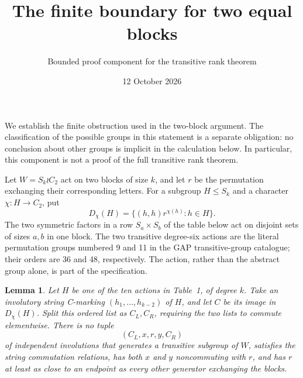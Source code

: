 \documentclass[11pt]{article}
\title{The finite boundary for two equal blocks}
\author{Bounded proof component for the transitive rank theorem}
\date{12 October 2026}
\newtheorem{lemma}{Lemma}
\begin{document}
\maketitle

We establish the finite obstruction used in the two-block argument.
The classification of the possible groups in this statement is a
separate obligation: no conclusion about other groups is implicit in
the calculation below. In particular, this component is not a proof
of the full transitive rank theorem.

Let $W=S_k\wr C_2$ act on two blocks of size $k$, and let $r$ be the
permutation exchanging their corresponding letters. For a subgroup
$H\leq S_k$ and a character $\chi:H\to C_2$, put
\[
 D_\chi(H)=\{(h,h)r^{\chi(h)}:h\in H\}.
\]
The two symmetric factors in a row $S_a\times S_b$ of the table below
act on disjoint sets of sizes $a,b$ in one block. The two transitive
degree-six actions are the literal permutation groups numbered 9
and 11 in the GAP transitive-group catalogue; their orders are 36
and 48, respectively. The action, rather than the abstract group
alone, is part of the specification.

\begin{lemma}\label{boundary}
Let $H$ be one of the ten actions in Table~1, of degree $k$.
Take an involutory string C-marking $(h_1,\ldots,h_{k-2})$
of $H$, and let $C$ be its image in $D_\chi(H)$. Split this ordered
list as $C_L,C_R$, requiring the two lists to commute elementwise.
There is no tuple
\[
                  (C_L,x,r,y,C_R)
\]
of independent involutions that generates a transitive subgroup of
$W$, satisfies the string commutation relations, has both $x$ and
$y$ noncommuting with $r$, and has $r$ at least as close to an
endpoint as every other generator exchanging the blocks.
\end{lemma}
\end{document}
